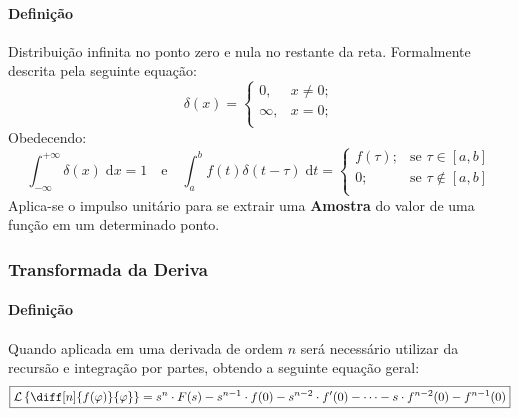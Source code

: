 \documentclass{article}
\begin{document}
                \paragraph{Definição}Distribuição infinita no ponto zero e nula no restante da reta. Formalmente descrita pela seguinte equação:
                    \begin{equation}
                        \boxed{
                            \delta(x) = 
                            \begin{cases}
                                0, & x \neq 0;\\
                                \infty, & x = 0;\\
                            \end{cases}
                            }
                        \end{equation}
                Obedecendo:
                    \begin{equation*}
                        \int_{-\infty}^{+\infty} \delta(x) \; \text{d}x = 1
                        \quad\text{e}\quad
                        \boxed{
                            \int_{a}^{b} f(t) \delta(t - \tau)\;\text{d}t = 
                            \begin{cases}
                                f(\tau);    & \text{se } \tau\in[a,b]\\
                                0;          & \text{se } \tau\notin[a,b]\\
                            \end{cases}
                        }
                    \end{equation*}
                Aplica-se o impulso unitário para se extrair uma \textbf{Amostra} do valor de uma função em um determinado ponto.

            \subsubsection{Transformada da Deriva}
                \paragraph{Definição}Quando aplicada em uma derivada de ordem $n$ será necessário utilizar da recursão e integração por partes, obtendo a seguinte equação geral:
                    \begin{equation}
                        \boxed{
                            \mathcal{L}\left\{\diff[n]{f(\varphi)}{\varphi}\right\} = 
                            s^{n}\cdot F(s) - 
                            s^{n-1} \cdot f(0) - 
                            s^{n-2} \cdot f'(0) - \dots - 
                            s \cdot f^{n-2}(0) - 
                            f^{n-1}(0)
                        }
                    \end{equation}
\end{document}
